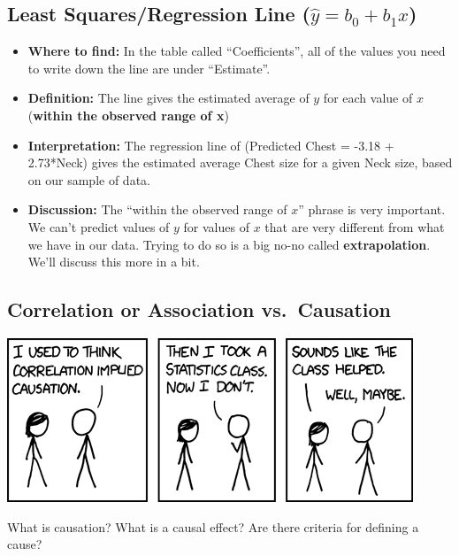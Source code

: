 \documentclass[]{book}
\begin{document}
\hypertarget{least-squaresregression-line-haty-b_0-b_1x}{%
\subsection{\texorpdfstring{Least Squares/Regression Line (\(\hat{y} = b_0 + b_1x\))}{Least Squares/Regression Line (\textbackslash{}hat\{y\} = b\_0 + b\_1x)}}\label{least-squaresregression-line-haty-b_0-b_1x}}

\begin{itemize}
\item
  \textbf{Where to find:} In the table called ``Coefficients'', all of the values you need to write down the line are under ``Estimate''.
\item
  \textbf{Definition:} The line gives the estimated average of \(y\) for each value of \(x\) (\textbf{within the observed range of x})
\item
  \textbf{Interpretation:} The regression line of (Predicted Chest = -3.18 + 2.73*Neck) gives the estimated average Chest size for a given Neck size, based on our sample of data.
\item
  \textbf{Discussion:} The ``within the observed range of \(x\)'' phrase is very important. We can't predict values of \(y\) for values of \(x\) that are very different from what we have in our data. Trying to do so is a big no-no called \textbf{extrapolation}. We'll discuss this more in a bit.
\end{itemize}

\hypertarget{correlation-or-association-vs.causation}{%
\subsection{Correlation or Association vs.~Causation}\label{correlation-or-association-vs.causation}}

\includegraphics{Photos/correlation.png}

What is causation? What is a causal effect? Are there criteria for defining a cause?
\end{document}
